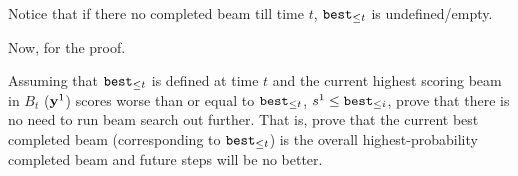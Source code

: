 Notice that if there no completed beam till time $t$, $\texttt{best}_{\leq t}$ is undefined/empty. 

Now, for the proof.

Assuming that $\texttt{best}_{\leq t}$ is defined at time $t$ and the current highest scoring beam in $B_t$ (\ie $\mathbf{y}^1$) scores worse than or equal to $\texttt{best}_{\leq t}$, \ie $s^1 \le \texttt{best}_{\leq i}$, 
prove that there is no need to run beam search out further. That is, 
prove that the current best completed beam (corresponding to $\texttt{best}_{\leq t}$) is the overall highest-probability completed beam  
and future steps will be no better.